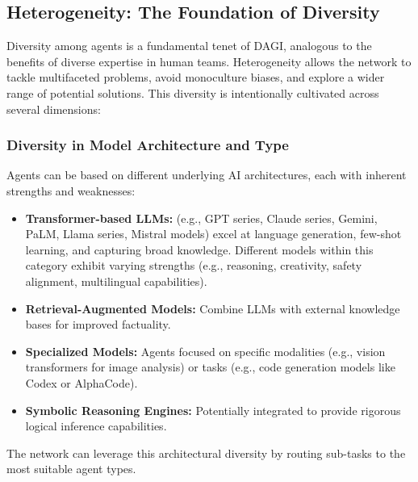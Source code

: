 \documentclass[12pt]{amsart}
\begin{document}
\subsection{Heterogeneity: The Foundation of Diversity}
Diversity among agents is a fundamental tenet of DAGI, analogous to the benefits of diverse expertise in human teams. Heterogeneity allows the network to tackle multifaceted problems, avoid monoculture biases, and explore a wider range of potential solutions. This diversity is intentionally cultivated across several dimensions:

\subsubsection{Diversity in Model Architecture and Type}
Agents can be based on different underlying AI architectures, each with inherent strengths and weaknesses:
\begin{itemize}[leftmargin=*]
    \item \textbf{Transformer-based LLMs:} (e.g., GPT series, Claude series, Gemini, PaLM, Llama series, Mistral models) excel at language generation, few-shot learning, and capturing broad knowledge. Different models within this category exhibit varying strengths (e.g., reasoning, creativity, safety alignment, multilingual capabilities).
    \item \textbf{Retrieval-Augmented Models:} Combine LLMs with external knowledge bases for improved factuality.
    \item \textbf{Specialized Models:} Agents focused on specific modalities (e.g., vision transformers for image analysis) or tasks (e.g., code generation models like Codex or AlphaCode).
    \item \textbf{Symbolic Reasoning Engines:} Potentially integrated to provide rigorous logical inference capabilities.
\end{itemize}
The network can leverage this architectural diversity by routing sub-tasks to the most suitable agent types.
\end{document}
